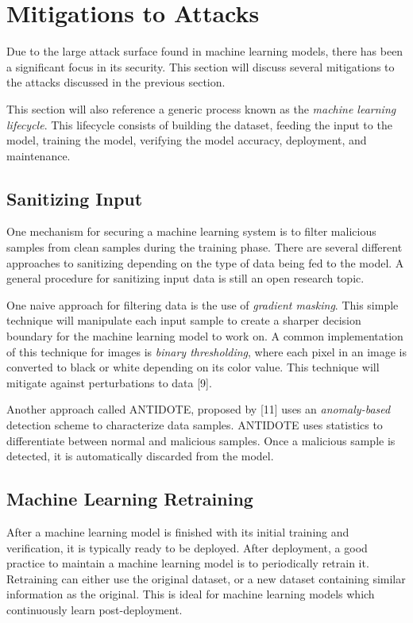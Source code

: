 \documentclass[11pt,conference]{IEEEtran}
\begin{document}
\section{Mitigations to Attacks}

Due to the large attack surface found in machine learning models, there has
been a significant focus in its security. This section will
discuss several mitigations to the attacks discussed in the previous
section. 

This section will also reference a generic process known as the \emph{machine
learning lifecycle}. This lifecycle consists of building the dataset, feeding
the input to the model, training the model, verifying the model accuracy,
deployment, and maintenance.

\subsection{Sanitizing Input}
One mechanism for securing a machine learning system is to 
filter malicious samples from clean samples during the training phase. There
are several different approaches to sanitizing depending on the type of data
being fed to the model. A general procedure for sanitizing input data is still
an open research topic.

One naive approach for filtering data is the use of \emph{gradient masking}.
This simple technique will manipulate each input sample to create a sharper
decision boundary for the machine learning model to work on. A common
implementation of this technique for images is \emph{binary thresholding},
where each pixel in an image is converted to black or white depending on its
color value. This technique will mitigate against perturbations to data
[9].

Another approach called ANTIDOTE, proposed by [11] uses an \emph{anomaly-based}
detection scheme to characterize data samples. ANTIDOTE uses statistics to
differentiate between normal and malicious samples. Once a malicious sample is
detected, it is automatically discarded from the model.

\subsection{Machine Learning Retraining}
After a machine learning model is finished with its initial training and
verification, it is typically ready to be deployed. After deployment, a good
practice to maintain a machine learning model is to periodically retrain it.
Retraining can either use the original dataset, or a new dataset containing
similar information as the original. This is ideal for machine learning models
which continuously learn post-deployment.
\end{document}

